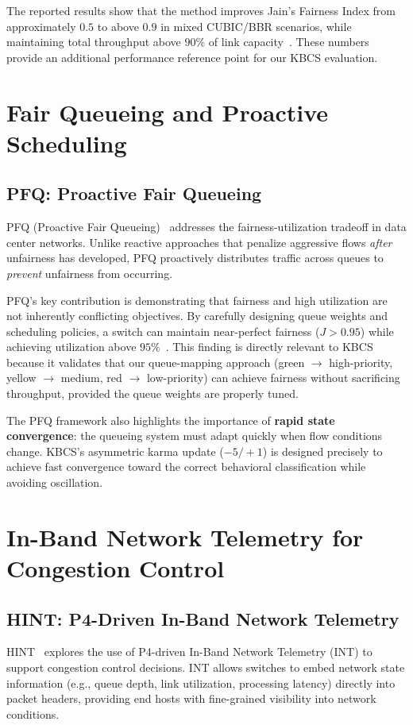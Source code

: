 \documentclass[12pt,a4paper]{report}
\begin{document}
The reported results show that the method improves Jain's Fairness Index from approximately $0.5$ to above $0.9$ in mixed CUBIC/BBR scenarios, while maintaining total throughput above $90\%$ of link capacity~\cite{buffermgmt}. These numbers provide an additional performance reference point for our KBCS evaluation.

\section{Fair Queueing and Proactive Scheduling}

\subsection{PFQ: Proactive Fair Queueing}
PFQ (Proactive Fair Queueing)~\cite{pfq} addresses the fairness-utilization tradeoff in data center networks. Unlike reactive approaches that penalize aggressive flows \textit{after} unfairness has developed, PFQ proactively distributes traffic across queues to \textit{prevent} unfairness from occurring.

PFQ's key contribution is demonstrating that fairness and high utilization are not inherently conflicting objectives. By carefully designing queue weights and scheduling policies, a switch can maintain near-perfect fairness ($J > 0.95$) while achieving utilization above $95\%$~\cite{pfq}. This finding is directly relevant to KBCS because it validates that our queue-mapping approach (green $\rightarrow$ high-priority, yellow $\rightarrow$ medium, red $\rightarrow$ low-priority) can achieve fairness without sacrificing throughput, provided the queue weights are properly tuned.

The PFQ framework also highlights the importance of \textbf{rapid state convergence}: the queueing system must adapt quickly when flow conditions change. KBCS's asymmetric karma update ($-5/+1$) is designed precisely to achieve fast convergence toward the correct behavioral classification while avoiding oscillation.

\section{In-Band Network Telemetry for Congestion Control}

\subsection{HINT: P4-Driven In-Band Network Telemetry}
HINT~\cite{hint} explores the use of P4-driven In-Band Network Telemetry (INT) to support congestion control decisions. INT allows switches to embed network state information (e.g., queue depth, link utilization, processing latency) directly into packet headers, providing end hosts with fine-grained visibility into network conditions.
\end{document}
